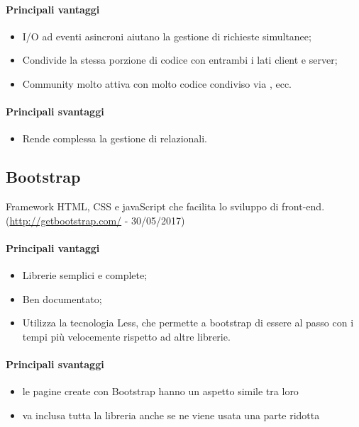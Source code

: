 \documentclass[../PianoDiQualifica.tex]{subfiles}
\begin{document}
			\paragraph{Principali vantaggi}
			\begin{itemize}
					\item I/O ad eventi asincroni aiutano la gestione di richieste simultanee;
					\item Condivide la stessa porzione di codice con entrambi i lati client e server;
					\item Community molto attiva con molto codice condiviso via , ecc.
				\end{itemize}
			\paragraph{Principali svantaggi}
				\begin{itemize}
					\item Rende complessa la gestione di  relazionali.
				\end{itemize}
			\subsection{Bootstrap}
				Framework HTML, CSS e javaScript che facilita lo sviluppo di front-end.\\
				(\url{http://getbootstrap.com/} - 30/05/2017) 
				\paragraph{Principali vantaggi}
				\begin{itemize}
					\item Librerie semplici e complete;
					\item Ben documentato;
					\item Utilizza la tecnologia Less, che permette a bootstrap di essere al passo con i tempi più velocemente rispetto ad altre librerie.
				\end{itemize}
				\paragraph{Principali svantaggi}
				\begin{itemize}
					\item le pagine create con Bootstrap hanno un aspetto simile tra loro
					\item va inclusa tutta la libreria anche se ne viene usata una parte ridotta
				\end{itemize}
\end{document}
